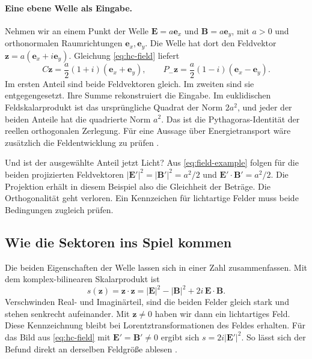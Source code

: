 \paragraph{Eine ebene Welle als Eingabe.}
Nehmen wir an einem Punkt der Welle \(\mathbf E=a\mathbf e_x\) und \(\mathbf B=a\mathbf e_y\), mit \(a>0\) und orthonormalen Raumrichtungen \(\mathbf e_x,\mathbf e_y\). Die Welle hat dort den Feldvektor \(\mathbf z=a(\mathbf e_x+i\mathbf e_y)\). Gleichung \eqref{eq:hc-field} liefert
\begin{equation}
 C\mathbf z=\frac a2(1+i)(\mathbf e_x+\mathbf e_y),\qquad
 P_-\mathbf z=\frac a2(1-i)(\mathbf e_x-\mathbf e_y).
 \label{eq:field-example}
\end{equation}
Im ersten Anteil sind beide Feldvektoren gleich. Im zweiten sind sie entgegengesetzt. Ihre Summe rekonstruiert die Eingabe. Im euklidischen Feldskalarprodukt ist das ursprüngliche Quadrat der Norm \(2a^2\), und jeder der beiden Anteile hat die quadrierte Norm \(a^2\). Das ist die Pythagoras-Identität der reellen orthogonalen Zerlegung. Für eine Aussage über Energietransport wäre zusätzlich die Feldentwicklung zu prüfen \cite{feldsektoren,grundidee}.



Und ist der ausgewählte Anteil jetzt Licht? Aus \eqref{eq:field-example} folgen für die beiden projizierten Feldvektoren \(|\mathbf E'|^2=|\mathbf B'|^2=a^2/2\) und \(\mathbf E'\cdot\mathbf B'=a^2/2\). Die Projektion erhält in diesem Beispiel also die Gleichheit der Beträge. Die Orthogonalität geht verloren. Ein Kennzeichen für lichtartige Felder muss beide Bedingungen zugleich prüfen.

\subsection{Wie die Sektoren ins Spiel kommen}
\label{sec:frames}

Die beiden Eigenschaften der Welle lassen sich in einer Zahl zusammenfassen. Mit dem komplex-bilinearen Skalarprodukt ist
\begin{equation}
 s(\mathbf z)=\mathbf z\cdot\mathbf z
 =|\mathbf E|^2-|\mathbf B|^2+2i\,\mathbf E\cdot\mathbf B .
 \label{eq:field-invariant}
\end{equation}
Verschwinden Real- und Imaginärteil, sind die beiden Felder gleich stark und stehen senkrecht aufeinander. Mit \(\mathbf z\ne0\) haben wir dann ein lichtartiges Feld. Diese Kennzeichnung bleibt bei Lorentztransformationen des Feldes erhalten. Für das Bild aus \eqref{eq:hc-field} mit \(\mathbf E'=\mathbf B'\ne0\) ergibt sich \(s=2i|\mathbf E'|^2\). So lässt sich der Befund direkt an derselben Feldgröße ablesen \cite{grundidee,feldkern}.

